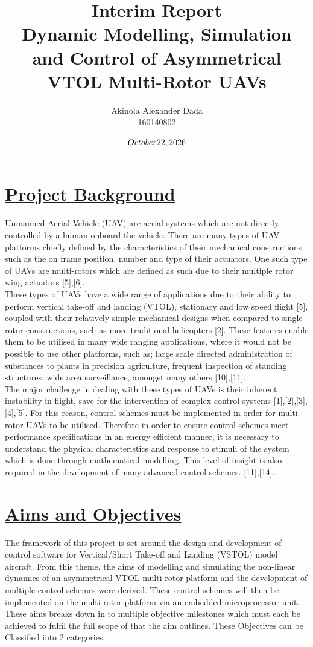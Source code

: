 \documentclass[12pt,a4paper,twoside]{report}
\title{Interim Report \\ Dynamic Modelling, Simulation and Control of Asymmetrical VTOL Multi-Rotor UAVs}
\author{Akinola Alexander Dada \\ 160140802}
\date{$\today$}
\begin{document}
		
	\maketitle
	\newpage
	\section*{\underline{Project Background}}
	 
		Unmanned Aerial Vehicle (UAV) are aerial systems which are not directly controlled by a human onboard the vehicle. There are many types of UAV platforms chiefly defined by the characteristics of their mechanical constructions, such as the on frame position, number and type of their actuators. One such type of UAVs are multi-rotors which are defined as such due to their multiple rotor wing actuators [5],[6]. 
		\\
		These types of UAVs have a wide range of applications due to their ability to perform vertical take-off and landing (VTOL), stationary and low speed flight [5], coupled with their relatively simple mechanical designs when compared to single rotor constructions, such as more traditional helicopters [2]. These features enable them to be utilised in many wide ranging applications, where it would not be possible to use other platforms, such as; large scale directed administration of substances to plants in precision agriculture, frequent inspection of standing structures, wide area surveillance, amongst many others [10],[11].
		\\
		The major challenge in dealing with these types of UAVs is their inherent instability in flight, save for the intervention of complex control systems [1],[2],[3],[4],[5]. For this reason, control schemes must be implemented in order for multi-rotor UAVs to be utilised. Therefore in order to ensure control schemes meet performance specifications in an energy efficient manner, it is necessary to understand the physical characteristics and response to stimuli of the system which is done through mathematical modelling. This level of insight is also required in the development of many advanced control schemes. [11],[14].
		
	\section*{\underline{Aims and Objectives}}
		
		The framework of this project is set around the design and development of control software for Vertical/Short Take-off and Landing (VSTOL) model aircraft. From this theme, the aims of modelling and simulating the non-linear dynamics of an asymmetrical VTOL multi-rotor platform and the development of multiple control schemes were derived. These control schemes will then be implemented on the multi-rotor platform via an embedded microprocessor unit. 
		\\
		These aims breaks down in to multiple objective milestones which must each be achieved to fulfil the full scope of that the aim outlines. These Objectives can be Classified into 2 categories:
\end{document}
